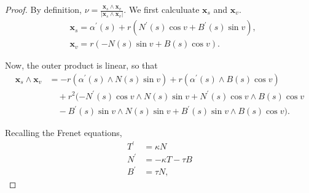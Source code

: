 \documentclass[11pt]{article}
\begin{document}
\begin{proof}
  By definition, \(\nu = \frac{\mathbf{x}_{s} \wedge \mathbf{x}_v}{|\mathbf{x}_s \wedge \mathbf{x}_v |}\).
  We first calculuate \( \mathbf{x}_{s} \) and \( \mathbf{x}_{v} \).
  \begin{equation}
  \label{eq:20}
  \begin{aligned}
    &\mathbf{x}_s = \alpha^{\prime}(s) + r \left( N^{\prime}(s)\cos v + B^{\prime}(s) \sin v \right), \\
    & \mathbf{x}_v = r \left( -N(s)\sin v + B(s)\cos v \right).
  \end{aligned}
  \end{equation}

  Now, the outer product is linear, so that
  \begin{equation}
  \label{eq:21}
  \begin{aligned}
    \mathbf{x}_s \wedge \mathbf{x}_v &= -r (\alpha^{\prime}(s) \wedge N(s)\sin v) + r( \alpha^{\prime}(s) \wedge B(s)\cos v ) \\
                                &\quad+ r^2 (-N^{\prime}(s)\cos v \wedge N(s) \sin v + N^{\prime}(s)\cos v \wedge B(s) \cos v \\
                                &\quad- B^{\prime}(s) \sin v \wedge N(s)\sin v + B^{\prime}(s) \sin v \wedge B(s) \cos v).
  \end{aligned}
  \end{equation}

  Recalling the Frenet equations,
  \begin{equation}
  \label{eq:22}
  \begin{aligned}
    T^{\prime} &= \kappa N \\
    N^{\prime} &= -\kappa T - \tau B \\
    B^{\prime} &= \tau N,
  \end{aligned}
  \end{equation}


\end{proof}
\end{document}
